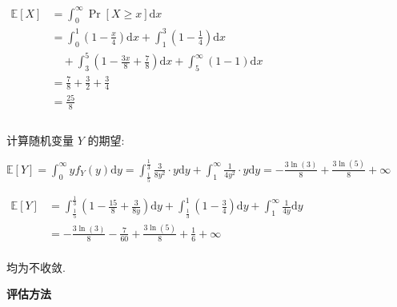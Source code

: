 \documentclass[answers]{exam}  %
\begin{document}
\begin{questions}
\begin{solution}
\begin{enumerate}
            $
              \begin{aligned}
                \mathbb{E}[X] & = \int_{0}^{\infty} \operatorname{Pr}[X \ge x] \mathrm{d}x                                                \\
                              & = \int_{0}^{1} (1 - \frac{x}{4}) \mathrm{d}x + \int_{1}^{3} (1 - \frac{1}{4}) \mathrm{d}x                 \\
                              & \quad + \int_{3}^{5} (1 - \frac{3x}{8} + \frac{7}{8}) \mathrm{d}x + \int_{5}^{\infty} (1 - 1) \mathrm{d}x \\
                              & = \frac{7}{8} + \frac{3}{2} + \frac{3}{4}                                                                 \\
                              & = \frac{25}{8}                                                                                            \\
                \\
              \end{aligned}
            $

            计算随机变量 $Y$ 的期望:

            $\displaystyle \mathbb{E}[Y] = \int_{0}^{\infty} yf_{Y}(y) \mathrm{d}y = \int_{\frac{1}{5}}^{\frac{1}{3}} \frac{3}{8y^{2}} \cdot y \mathrm{d}y + \int_{1}^{\infty} \frac{1}{4y^{2}} \cdot y \mathrm{d}y = - \frac{3 \ln{\left(3 \right)}}{8} + \frac{3 \ln{\left(5 \right)}}{8} + \infty$

            $
            \begin{aligned}
            \mathbb{E}[Y] &= \int_{\frac{1}{5}}^{\frac{1}{3}} (1 - \frac{15}{8} + \frac{3}{8y}) \mathrm{d}y + \int_{\frac{1}{3}}^{1} (1 - \frac{3}{4}) \mathrm{d}y + \int_{1}^{\infty} \frac{1}{4y} \mathrm{d}y \\
            &= - \frac{3 \ln{\left(3 \right)}}{8} - \frac{7}{60} + \frac{3 \ln{\left(5 \right)}}{8} + \frac{1}{6} + \infty \\
            \end{aligned}
            $

            均为不收敛.
    \end{enumerate}
  \end{solution}


  \question [40] \textbf{评估方法}


\end{questions}
\end{document}
